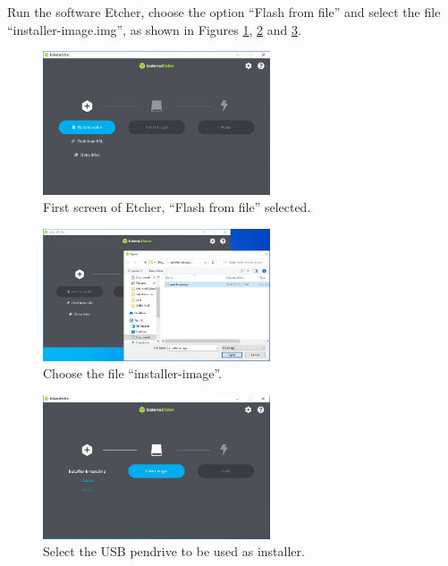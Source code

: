 \documentclass[11pt,a4paper]{article}
\begin{document}
Run the software Etcher, choose the option ``Flash from file'' and select the file ``installer-image.img'', as shown in Figures \ref{fig:balena2}, \ref{fig:balena3} and \ref{fig:balena4}.

\begin{figure}[H]
  \centering
  \includegraphics[width=0.6\textwidth]{pictures/balena-2-ed.jpg}
  \caption{First screen of Etcher, ``Flash from file'' selected.}
  \label{fig:balena2}
\end{figure}

\begin{figure}[H]
  \centering
  \includegraphics[width=0.6\textwidth]{pictures/balena-3-ed.jpg}
  \caption{Choose the file ``installer-image''.}
  \label{fig:balena3}
\end{figure}

\begin{figure}[H]
  \centering
  \includegraphics[width=0.6\textwidth]{pictures/balena-4-ed.jpg}
  \caption{Select the USB pendrive to be used as installer.}
  \label{fig:balena4}
\end{figure}
\end{document}
